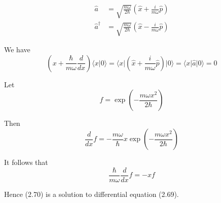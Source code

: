 


\bigskip
\begin{align*}
\hat a&=\sqrt{\frac{m\omega}{2\hbar}}
\left(\hat x+\frac{i}{m\omega}\hat p\right)
\tag{2.9}
\\
\hat a^\dag&=\sqrt{\frac{m\omega}{2\hbar}}
\left(\hat x-\frac{i}{m\omega}\hat p\right)
\tag{2.10}
\end{align*}

We have
\begin{equation*}
\left(x+\frac{\hbar}{m\omega}\frac{d}{dx}\right)\langle x|0\rangle
=\langle x|\left(\hat x+\frac{i}{m\omega}\hat p\right)|0\rangle
=\langle x|\hat a|0\rangle
=0
\end{equation*}

Let
\begin{equation*}
f=\exp\left(-\frac{m\omega x^2}{2\hbar}\right)
\end{equation*}

Then
\begin{equation*}
\frac{d}{dx}f=-\frac{m\omega}{\hbar}x\exp\left(-\frac{m\omega x^2}{2\hbar}\right)
\end{equation*}

It follows that
\begin{equation*}
\frac{\hbar}{m\omega}\frac{d}{dx}f=-xf
\end{equation*}

Hence (2.70) is a solution to differential equation (2.69).


